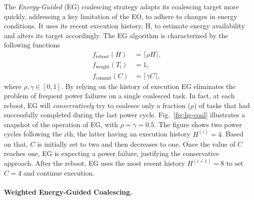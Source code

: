 The \emph{Energy-Guided} (EG) coalescing strategy adapts its coalescing target more quickly, addressing a key limitation of the EO, to adhere to changes in energy conditions. It uses its recent execution history, H, to estimate energy availability and alters its target accordingly. The EG algorithm is characterized by the following functions
%
\begin{equation}
	\begin{split}
		 f_\text{reboot}(H) & = \lceil \rho H \rceil,\\
		 f_\text{weight}(T_\text{i}) & = 1, \\
		 f_\text{commit}(C) & = \lceil \gamma C \rceil,
	\end{split}
	\label{eq:eg}
\end{equation}
%
where $\rho, \gamma \in [0, 1]$. By relying on the history of execution EG eliminates the problem of frequent power failures on a single coalesced task. In fact, at each reboot, EG will {\em conservatively} try to coalesce only a fraction ($\rho$) of tasks that had successfully completed during the last power cycle.
Fig.~\ref{fig:hg-coal} illustrates a snapshot of the operation of EG, with $\rho = \gamma = 0.5$. The figure shows two power cycles following the $i$th, the latter having an execution history $H^{(i)} = 4$. Based on that, $C$ is initially set to two and then decreases to one. Once the value of $C$ reaches one, EG is expecting a power failure, justifying the conservative approach. After the reboot, EG uses the most recent history $H^{(i+1)} = 8$ to set $C = 4$ and continue execution.

\paragraph{Weighted Energy-Guided Coalescing.}
\label{subsec:energyTaskAware}

